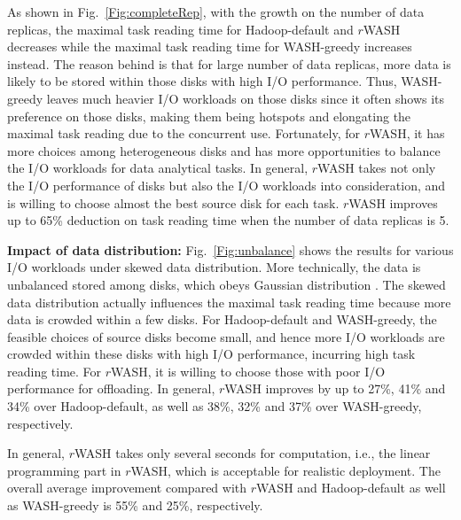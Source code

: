 \documentclass[conference]{IEEEtran}
\begin{document}
As shown in Fig.~\ref{Fig:completeRep}, with the growth on the number of data replicas, the maximal task reading time for Hadoop-default and $r$WASH decreases while the maximal task reading time for WASH-greedy increases instead. The reason behind is that for large number of data replicas, more data is likely to be stored within those disks with high I/O performance. Thus, WASH-greedy leaves much heavier I/O workloads on those disks since it often shows its preference on those disks, making them being hotspots and elongating the maximal task reading due to the concurrent use. Fortunately, for $r$WASH, it has more choices among heterogeneous disks and has more opportunities to balance the I/O workloads for data analytical tasks. In general, $r$WASH takes not only the I/O performance of disks but also the I/O workloads into consideration, and is willing to choose almost the best source disk for each task. $r$WASH improves up to 65\% deduction on task reading time when the number of data replicas is 5.

 \textbf{Impact of data distribution:} Fig.~\ref{Fig:unbalance} shows the results for various I/O workloads under skewed data distribution. More technically, the data is unbalanced stored among disks, which obeys Gaussian distribution \cite{b44}. The skewed data distribution actually influences the maximal task reading time because more data is crowded within a few disks. For Hadoop-default and WASH-greedy, the feasible choices of source disks become small, and hence more I/O workloads are crowded within these disks with high I/O performance, incurring high task reading time. For $r$WASH, it is willing to choose those with poor I/O performance for offloading. In general, $r$WASH improves by up to 27\%, 41\% and 34\% over Hadoop-default, as well as 38\%, 32\% and 37\% over WASH-greedy, respectively.


In general, $r$WASH takes only several seconds for computation, i.e., the linear programming part in $r$WASH, which is acceptable for realistic deployment. The overall average improvement compared with $r$WASH and Hadoop-default as well as WASH-greedy is 55\% and 25\%, respectively.
\end{document}
